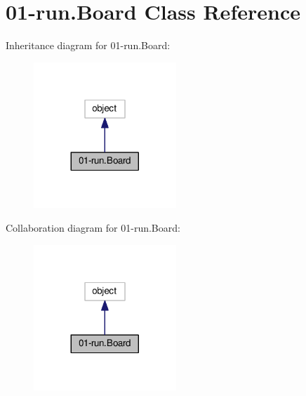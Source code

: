 \hypertarget{class01-run_1_1Board}{}\section{01-\/run.Board Class Reference}
\label{class01-run_1_1Board}


Inheritance diagram for 01-\/run.Board\+:
\nopagebreak
\begin{figure}[H]
\begin{center}
\leavevmode
\includegraphics[width=152pt]{class01-run_1_1Board__inherit__graph}
\end{center}
\end{figure}


Collaboration diagram for 01-\/run.Board\+:
\nopagebreak
\begin{figure}[H]
\begin{center}
\leavevmode
\includegraphics[width=152pt]{class01-run_1_1Board__coll__graph}
\end{center}
\end{figure}
